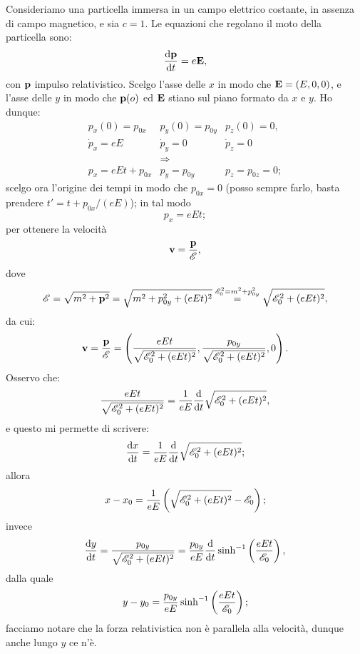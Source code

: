 \begin{esempio}
  Consideriamo una particella immersa in un campo elettrico costante,
  in assenza di campo magnetico, e sia $c = 1$. Le equazioni che
  regolano il moto della particella sono:
$$
\frac{\mathrm{d} \mathbf{p}}{\mathrm{d} t} = e \mathbf{E},
$$
con $\mathbf{p}$ impulso relativistico. Scelgo l'asse delle $x$ in modo
che $\mathbf{E}=(E,0,0)$, e l'asse delle $y$ in modo che $\mathbf{p}(o)$ ed
$\mathbf{E}$ stiano sul piano formato da $x$ e $y$.  Ho dunque:
$$
\begin{array}{ccc}
  p_x(0) = p_{0x} & p_y(0) = p_{0y} & p_z(0) = 0,\\
  \dot{p}_x = e E & \dot{p}_y = 0 & \dot{p}_z = 0 \\
  & \Longrightarrow & \\
  p_x= e E t + p_{0x} & p_y = p_{0y} & p_z = p_{0z} = 0;
\end{array}
$$
scelgo ora l'origine dei tempi in modo che $p_{0x} = 0$ (posso sempre
farlo, basta prendere $t' = t + p_{0x}/(e E)$); in tal modo
$$
p_x = e E t;
$$
per ottenere la velocit\`a
$$
\mathbf{v} = \frac{\mathbf{p}}{\mathscr{E}},
$$
dove
$$
\mathscr{E} = \sqrt{m^2 + \mathbf{p}^2} = \sqrt{m^2 + p_{0y}^2 + (e E t)^2}
\stackrel{\mathscr{E}_0^2 = m^2 + p_{0y}^2}{=} \sqrt{\mathscr{E}_0^2 + (e E
  t)^2},
$$
da cui:
$$
\mathbf{v} = \frac{\mathbf{p}}{\mathscr{E}} = \left( \frac{e E
    t}{\sqrt{\mathscr{E}_0^2 + (e E t)^2}}, \frac{p_{0y}}{\sqrt{\mathscr{E}_0^2
      + (e E t)^2}}, 0\right).
$$
Osservo che:
$$
\frac{e E t}{\sqrt{\mathscr{E}_0^2 + (e E t)^2}} = \frac{1}{e E}
\frac{\mathrm{d}}{\mathrm{d} t}\sqrt{\mathscr{E}_0^2 + (e E t)^2},
$$
e questo mi permette di scrivere:
$$
\frac{\mathrm{d} x}{\mathrm{d} t} = \frac{1}{e E} \frac{\mathrm{d}}{\mathrm{d} t}\sqrt{\mathscr{E}_0^2
  + (e E t)^2};
$$
allora
$$
x - x_0 = \frac{1}{e E}\left( \sqrt{\mathscr{E}_0^2 + (e E t)^2} -
  \mathscr{E}_0\right);
$$
invece
$$
\frac{\mathrm{d} y}{\mathrm{d} t} = \frac{p_{0y}}{\sqrt{\mathscr{E}_0^2 + (e E t)^2}} =
\frac{p_{0y}}{e E} \frac{\mathrm{d}}{\mathrm{d} t} \sinh^{-1}\left( \frac{e E
    t}{\mathscr{E}_0}\right),
$$
dalla quale
$$
y - y_0 = \frac{p_{0y}}{e E} \sinh^{-1}\left( \frac{e E
    t}{\mathscr{E}_0}\right);
$$
facciamo notare che la forza relativistica non \`e parallela alla
velocit\`a, dunque anche lungo $y$ ce n'\`e.


\end{esempio}
